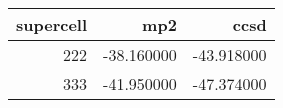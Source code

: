 \begin{tabular}{rrr}
\toprule
supercell & mp2 & ccsd \\
\midrule
222 & -38.160000 & -43.918000 \\
333 & -41.950000 & -47.374000 \\
\bottomrule
\end{tabular}
